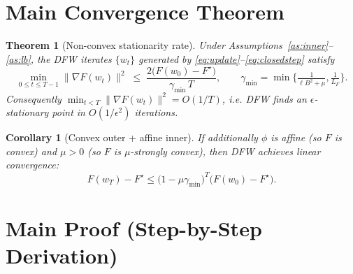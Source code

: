 \documentclass[11pt]{article}
\newtheorem{theorem}{Theorem}
\newtheorem{corollary}{Corollary}
\begin{document}
\section*{Main Convergence Theorem}

\begin{theorem}[Non-convex stationarity rate]\label{thm:main}
Under Assumptions~\ref{as:inner}--\ref{as:lb}, the DFW iterates
$\{w_t\}$ generated by \eqref{eq:update}--\eqref{eq:closedstep} satisfy
\[
\min_{0\le t \le T-1} \|\nabla F(w_t)\|^2
\;\le\;
\frac{2\big(F(w_0) - F^\star\big)}{\gamma_{\min}\, T},
\qquad
\gamma_{\min} = \min\Big\{\tfrac{1}{\ell B^2+\mu},\tfrac{1}{L_F}\Big\}.
\]
Consequently $\min_{t<T}\|\nabla F(w_t)\|^2 = O(1/T)$, i.e. DFW finds an
$\epsilon$-stationary point in $O(1/\epsilon^2)$ iterations.
\end{theorem}

\begin{corollary}[Convex outer + affine inner]\label{cor:convex}
If additionally $\phi$ is affine (so $F$ is convex) and $\mu>0$ (so $F$ is
$\mu$-strongly convex), then DFW achieves linear convergence:
\[
F(w_T) - F^\star \le \Big(1 - \mu\gamma_{\min}\Big)^{T}\big(F(w_0)-F^\star\big).
\]
\end{corollary}

\section*{Main Proof (Step-by-Step Derivation)}
\end{document}
